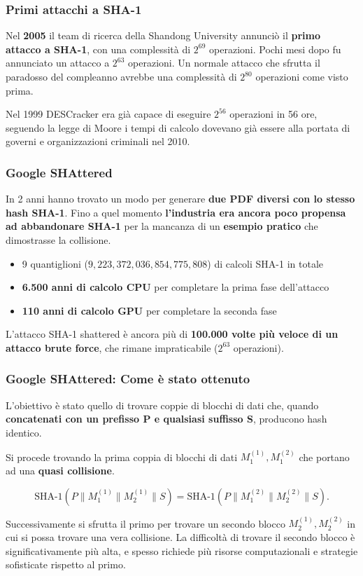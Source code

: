\begin{frame}
	\frametitle{Primi attacchi a SHA-1}
	Nel \textbf{2005} il team di ricerca della Shandong University annunciò il \textbf{primo attacco a SHA-1}, con una complessità di \(2^{69}\) operazioni.
	Pochi mesi dopo fu annunciato un attacco a \(2^{63}\) operazioni.
	Un normale attacco che sfrutta il paradosso del compleanno avrebbe una complessità di \(2^{80}\) operazioni come visto prima.

	\vspace{1cm}

	Nel 1999 DESCracker era già capace di eseguire \(2^{56}\) operazioni in 56 ore, seguendo la legge di Moore i tempi di calcolo dovevano già essere alla portata di governi e organizzazioni criminali nel 2010.
\end{frame}


\begin{frame}
	\frametitle{Google SHAttered}

	In 2 anni hanno trovato un modo per generare \textbf{due PDF diversi con lo stesso hash SHA-1}.
	Fino a quel momento \textbf{l'industria era ancora poco propensa ad abbandonare SHA-1} per la mancanza di un \textbf{esempio pratico} che dimostrasse la collisione.
	\begin{itemize}
		\item 9 quantiglioni (\(9,223,372,036,854,775,808\)) di calcoli SHA-1 in totale
		\item \textbf{6.500 anni di calcolo CPU} per completare la prima fase dell'attacco
		\item \textbf{110 anni di calcolo GPU} per completare la seconda fase
	\end{itemize}

	L'attacco SHA-1 shattered è ancora più di \textbf{100.000 volte più veloce di un attacco brute force}, che rimane impraticabile (\(2^{63}\) operazioni).
\end{frame}

\begin{frame}
	\frametitle{Google SHAttered: Come è stato ottenuto}

	L'obiettivo è stato quello di trovare coppie di blocchi di dati che, quando \textbf{concatenati con un prefisso P e qualsiasi suffisso S}, producono hash identico.

	Si procede trovando la prima coppia di blocchi di dati \(M_{1}^{(1)}, M_{1}^{(2)}\) che portano ad una \textbf{quasi collisione}.

	\[
		\text{SHA-1} \left( P \parallel M_{1}^{(1)} \parallel M_{2}^{(1)} \parallel S \right) = \text{SHA-1} \left( P \parallel M_{1}^{(2)} \parallel M_{2}^{(2)} \parallel S \right).
	\]


	Successivamente si sfrutta il primo per trovare un secondo blocco \(M_{2}^{(1)}, M_{2}^{(2)}\) in cui si possa trovare una vera collisione.
	La difficoltà di trovare il secondo blocco è significativamente più alta, e spesso richiede più risorse computazionali e strategie sofisticate rispetto al primo.

\end{frame}

